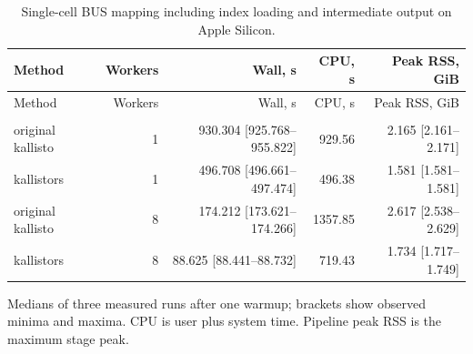 \begingroup
\small
\setlength{\tabcolsep}{4pt}
\begin{longtable}{@{}lrrrr@{}}
\caption{Single-cell BUS mapping including index loading and intermediate output on Apple Silicon.}\label{tab:paper-single-cell-mapping}\\
\toprule
Method & Workers & Wall, s & CPU, s & Peak RSS, GiB \\
\midrule
\endfirsthead
\toprule
Method & Workers & Wall, s & CPU, s & Peak RSS, GiB \\
\midrule
\endhead
\bottomrule
\endfoot
\addlinespace
\multicolumn{5}{@{}l}{\textit{gencode: pbmc\_1k\_v3}} \\
original kallisto & 1 & 930.304 [925.768--955.822] & 929.56 & 2.165 [2.161--2.171] \\
kallistors & 1 & 496.708 [496.661--497.474] & 496.38 & 1.581 [1.581--1.581] \\
original kallisto & 8 & 174.212 [173.621--174.266] & 1357.85 & 2.617 [2.538--2.629] \\
kallistors & 8 & 88.625 [88.441--88.732] & 719.43 & 1.734 [1.717--1.749] \\
\end{longtable}
\noindent\footnotesize Medians of three measured runs after one warmup; brackets show observed minima and maxima. CPU is user plus system time. Pipeline peak RSS is the maximum stage peak.
\endgroup
